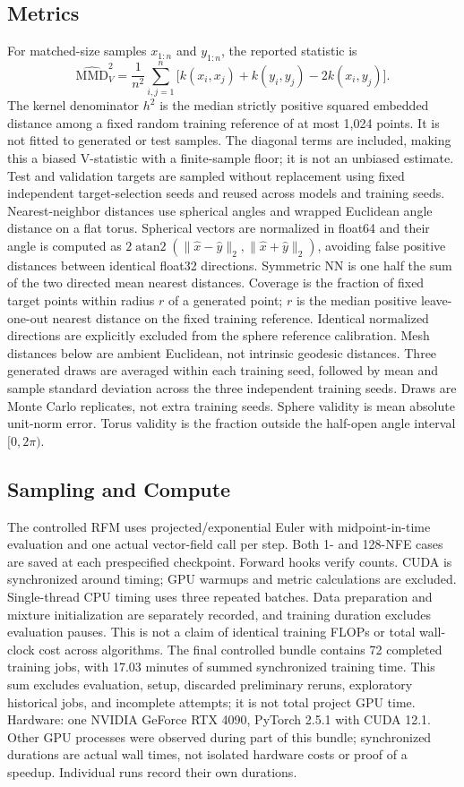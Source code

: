 \subsection{Metrics}
For matched-size samples $x_{1:n}$ and $y_{1:n}$, the reported statistic is
\begin{equation}\widehat{\mathrm{MMD}}_V^2=\frac{1}{n^2}\sum_{i,j=1}^n\big[k(x_i,x_j)+k(y_i,y_j)-2k(x_i,y_j)\big].\end{equation}
The kernel denominator $h^2$ is the median strictly positive squared embedded distance among a fixed random training reference of at most 1,024 points. It is not fitted to generated or test samples. The diagonal terms are included, making this a biased V-statistic with a finite-sample floor; it is not an unbiased estimate. Test and validation targets are sampled without replacement using fixed independent target-selection seeds and reused across models and training seeds.
Nearest-neighbor distances use spherical angles and wrapped Euclidean angle distance on a flat torus. Spherical vectors are normalized in float64 and their angle is computed as $2\operatorname{atan2}(\|\hat x-\hat y\|_2,\|\hat x+\hat y\|_2)$, avoiding false positive distances between identical float32 directions. Symmetric NN is one half the sum of the two directed mean nearest distances. Coverage is the fraction of fixed target points within radius $r$ of a generated point; $r$ is the median positive leave-one-out nearest distance on the fixed training reference. Identical normalized directions are explicitly excluded from the sphere reference calibration. Mesh distances below are ambient Euclidean, not intrinsic geodesic distances.
Three generated draws are averaged within each training seed, followed by mean and sample standard deviation across the three independent training seeds. Draws are Monte Carlo replicates, not extra training seeds. Sphere validity is mean absolute unit-norm error. Torus validity is the fraction outside the half-open angle interval $[0,2\pi)$.
\subsection{Sampling and Compute}
The controlled RFM uses projected/exponential Euler with midpoint-in-time evaluation and one actual vector-field call per step. Both 1- and 128-NFE cases are saved at each prespecified checkpoint. Forward hooks verify counts. CUDA is synchronized around timing; GPU warmups and metric calculations are excluded. Single-thread CPU timing uses three repeated batches. Data preparation and mixture initialization are separately recorded, and training duration excludes evaluation pauses. This is not a claim of identical training FLOPs or total wall-clock cost across algorithms.
The final controlled bundle contains 72 completed training jobs, with 17.03 minutes of summed synchronized training time. This sum excludes evaluation, setup, discarded preliminary reruns, exploratory historical jobs, and incomplete attempts; it is not total project GPU time. Hardware: one NVIDIA GeForce RTX 4090, PyTorch 2.5.1 with CUDA 12.1. Other GPU processes were observed during part of this bundle; synchronized durations are actual wall times, not isolated hardware costs or proof of a speedup. Individual runs record their own durations.
